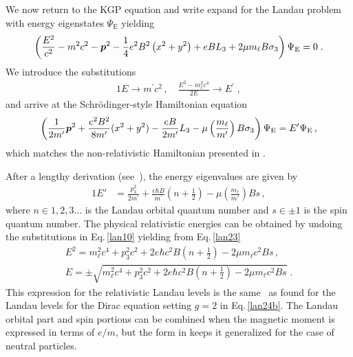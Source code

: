 We now return to the KGP equation and write expand  for the Landau problem with energy eigenstates $\Psi_\mathrm{E}$ yielding
\begin{alignat}{1}
    \label{lan09}
    \left(\frac{E^{2}}{c^{2}}-m^{2}c^{2}-\boldsymbol{p}^{2}-\frac{1}{4}e^{2}B^{2}\left(x^{2}+y^{2}\right)+eBL_{3}+2\mu m_{\ell} B\sigma_{3}\right)\Psi_\mathrm{E}=0\;.
\end{alignat} 
We introduce the substitutions 
\begin{alignat}{1}
    \label{lan10}
    E\to m^\prime c^{2}\,,\quad \frac{E^{2}-m_{\ell}^{2}c^{4}}{2E}\to E^\prime\;,
\end{alignat} 
and arrive at the Schr{\"o}dinger-style Hamiltonian equation
\begin{gather}
	\label{lan11} \left(\frac{1}{2m'}\boldsymbol{p}^{2}+\frac{e^{2}B^{2}}{8m'}(x^{2}+y^{2})-\frac{eB}{2m'}L_{3}-\mu\left(\frac{m_{\ell}}{m'}\right)B\sigma_{3}\right)\Psi_\mathrm{E}=E'\Psi_\mathrm{E}\,,
\end{gather}
which matches the non-relativistic Hamiltonian presented in .

After a lengthy derivation (see~\cite{Steinmetz:2018ryf}), the energy eigenvalues are given by
\begin{alignat}{1}
    \label{lan23}
    E'&=\frac{p_{3}^{2}}{2m^\prime }+\frac{e\hbar B}{m^\prime}\left(n+\frac{1}{2}\right)-\mu\left(\frac{m_{\ell}}{m'}\right)Bs\,,
\end{alignat}
where $n\in1,2,3\ldots$ is the Landau orbital quantum number and $s\in\pm1$ is the spin quantum number. The physical relativistic energies can be obtained by undoing the substitutions in Eq.\,\eqref{lan10} yielding from Eq.\,\eqref{lan23}
\begin{gather}
\label{lan24}
E^{2}=m_{\ell}^{2}c^{4}+p_{3}^{2}c^{2}+2e\hbar c^{2}B\left(n+\frac{1}{2}\right)-2\mu m_{\ell}c^{2}Bs\,,\\
\label{lan24b}
E=\pm\sqrt{m_{\ell}^{2}c^{4}+p_{3}^{2}c^{2}+2e\hbar c^{2}B\left(n+\frac{1}{2}\right)-2\mu m_{\ell}c^{2}Bs}\;.
\end{gather}
This expression for the relativistic Landau levels is the same~\cite{Johnson:1950zz,Ferrer:2009nq} as found for the Landau levels for the Dirac equation setting $g=2$ in Eq.\,\eqref{lan24b}. The Landau orbital part and spin portions can be combined when the magnetic moment is expressed in terms of $e/m$, but the form in  keeps it generalized for the case of neutral particles.

